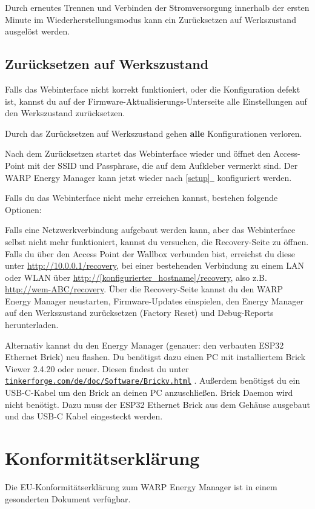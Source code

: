 \documentclass[a4paper,10pt]{article}
\newcommand{\hint}[1]{\begin{tcolorbox}[colback=boxgray,colframe=black,coltext=
white,title=Hinweis,left*=2mm,right*=2mm,boxsep=1mm,bottom=1mm,top=1mm]#1\end{tcolorbox}}
\newcommand*{\fullref}[1]{\hyperref[{#1}]{\ref*{#1}~\nameref*{#1}}}
\newcommand\rurl[2]{%
  \href{#1}{\nolinkurl{#2}}%
}
\begin{document}
\begin{multicols*}{2}
	Durch erneutes Trennen und Verbinden der Stromversorgung innerhalb der ersten Minute im Wiederherstellungsmodus kann ein Zurücksetzen auf Werkszustand ausgelöst werden.

	\subsection{Zurücksetzen auf Werkszustand}\label{reset}
	Falls das Webinterface nicht korrekt funktioniert, oder die Konfiguration defekt ist,
	kannst du auf der Firmware-Aktualisierungs-Unterseite alle Einstellungen auf den Werkszustand zurücksetzen.
	\hint{Durch das Zurücksetzen auf Werkszustand gehen \mbox{\textbf{alle}} Konfigurationen verloren.}
	Nach dem Zurücksetzen startet das Webinterface wieder und öffnet
	den Access-Point mit der SSID und Passphrase, die auf dem Aufkleber vermerkt
	sind. Der WARP Energy Manager kann jetzt wieder nach \fullref{setup} konfiguriert werden.

	Falls du das Webinterface nicht mehr erreichen kannst, bestehen folgende Optionen:

	Falls eine Netzwerkverbindung aufgebaut werden kann, aber das Webinterface selbst nicht mehr funktioniert, kannst du versuchen, die Recovery-Seite zu öffnen.
	Falls du über den Access Point der Wallbox verbunden bist, erreichst du diese unter \url{http://10.0.0.1/recovery},
	bei einer bestehenden Verbindung zu einem LAN oder WLAN über
	\url{http://[konfigurierter_hostname]/recovery}, also z.B. \url{http://wem-ABC/recovery}.
	Über die Recovery-Seite kannst du den WARP Energy Manager neustarten, Firmware-Updates einspielen,
	den Energy Manager auf den Werkszustand zurücksetzen (Factory Reset) und Debug-Reports
	herunterladen.

	Alternativ kannst du den Energy Manager (genauer: den verbauten ESP32 Ethernet
	Brick) neu flashen.
	Du benötigst dazu einen PC mit installiertem Brick Viewer 2.4.20 oder neuer. Diesen findest du unter
	\rurl{https://www.tinkerforge.com/de/doc/Software/Brickv.html}{tinkerforge.com/de/doc/Software/Brickv.html}.
	Außerdem benötigst du ein USB-C-Kabel um den Brick an deinen PC anzuschließen. Brick Daemon wird nicht benötigt.
	Dazu muss der ESP32 Ethernet Brick aus dem Gehäuse ausgebaut und das USB-C
	Kabel eingesteckt werden.

	\section{Konformitätserklärung}
	Die EU-Konformitätserklärung zum WARP Energy Manager ist in einem gesonderten Dokument verfügbar.


\end{multicols*}
\end{document}
